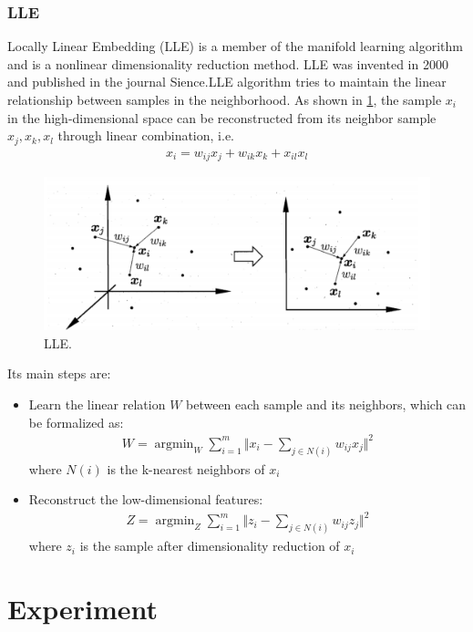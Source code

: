 \documentclass{article}
\begin{document}
\subsubsection{LLE}
Locally Linear Embedding (LLE) is a member of the manifold learning algorithm and is a nonlinear dimensionality reduction method. LLE was invented in 2000 and published in the journal Sience.\cite{roweis2000nonlinear}LLE algorithm tries to maintain the linear relationship between samples in the neighborhood. As shown in \ref{fig:LLE}, the sample $x_i$ in the high-dimensional space can be reconstructed from its neighbor sample $x_j,x_k,x_l$ through linear combination, i.e.
\begin{eqnarray}
x_i = w_{ij}x_j+w_{ik}x_k+x_{il}x_l
\end{eqnarray}
\begin{figure}[htbp]
	\centering
	\includegraphics[scale=0.3]{figures/LLE.png}
	\caption{LLE.}
	\label{fig:LLE}
\end{figure}\par
\indent Its main steps are:
\begin{itemize}
	\item Learn the linear relation $W$ between each sample and its neighbors, which can be formalized as:
	\begin{eqnarray}
	W = \mathop{\arg\min}_{W}\sum_{i=1}^{m}\Vert x_i-\sum_{j\in N(i)}w_{ij}x_j\Vert^2 
	\end{eqnarray}
	where $N(i)$ is the k-nearest neighbors of $x_i$
	
	\item  Reconstruct the low-dimensional features:
	\begin{eqnarray}
	Z = \mathop{\arg\min}_{Z}\sum_{i=1}^{m}\Vert z_i-\sum_{j\in N(i)}w_{ij}z_j\Vert^2 
	\end{eqnarray}
	where $z_i$ is the sample after dimensionality reduction of $x_i$
\end{itemize}

\section{Experiment}
\end{document}
